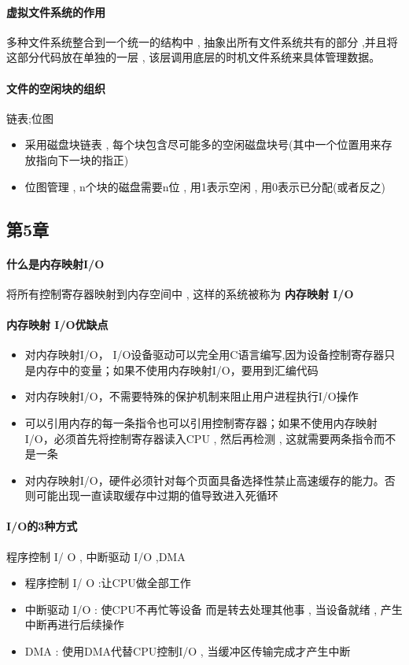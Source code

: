 \documentclass[UTF8,a4paper]{ctexart}
\begin{document}
\paragraph{虚拟文件系统的作用}多种文件系统整合到一个统一的结构中 , 抽象出所有文件系统共有的部分 ,并且将这部分代码放在单独的一层 , 该层调用底层的时机文件系统来具体管理数据。

\paragraph{文件的空闲块的组织}链表;位图
\begin{itemize}
	\item 采用磁盘块链表 , 每个块包含尽可能多的空闲磁盘块号(其中一个位置用来存放指向下一块的指正)
	\item 位图管理 , n个块的磁盘需要n位 , 用1表示空闲 , 用0表示已分配(或者反之)
\end{itemize}

\subsection{第5章}
\paragraph{什么是内存映射I/O}
将所有控制寄存器映射到内存空间中 , 这样的系统被称为 \textbf{内存映射 I/O}
\paragraph{内存映射 I/O优缺点}
\begin{itemize}
	\item 对内存映射I/O， I/O设备驱动可以完全用C语言编写,因为设备控制寄存器只是内存中的变量；如果不使用内存映射I/O，要用到汇编代码
	\item 对内存映射I/O，不需要特殊的保护机制来阻止用户进程执行I/O操作
	\item 可以引用内存的每一条指令也可以引用控制寄存器；如果不使用内存映射I/O，必须首先将控制寄存器读入CPU  , 然后再检测 , 这就需要两条指令而不是一条
	\item 对内存映射I/O，硬件必须针对每个页面具备选择性禁止高速缓存的能力。否则可能出现一直读取缓存中过期的值导致进入死循环
\end{itemize}

\paragraph{I/O的3种方式} 程序控制 I/ O , 中断驱动 I/O  ,DMA
\begin{itemize}
	\item 程序控制 I/ O :让CPU做全部工作
	\item 中断驱动 I/O  : 使CPU不再忙等设备 而是转去处理其他事 , 当设备就绪 , 产生中断再进行后续操作
	\item DMA : 使用DMA代替CPU控制I/O , 当缓冲区传输完成才产生中断
\end{itemize}
\end{document}
